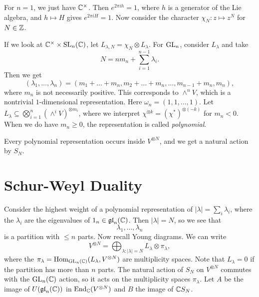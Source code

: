 \begin{example}
  For $n = 1$, we just have
  $\mathbb{C}^\times$. Then $e^{2\pi i h} = 1$,
  where $h$ is a generator of the Lie
  algebra, and $h \mapsto H$
  gives $e^{2\pi i H} = 1$.
  Now consider the character $\chi_N : z \mapsto z^N$ for
  $N \in \mathbb{Z}$.

  If we look at $\mathbb{C}^\times \times \operatorname{SL}_n(\mathbb{C})$,
  let $L_{\lambda, N} = \chi_N \otimes L_\lambda$.
  For $\operatorname{GL}_n$, consider $L_\lambda $ and
  take
  \[
    N = n m_n + \sum_{i = 1}^{n - 1} \lambda_i.
  \]
  Then we get
  \[
    (\lambda_1, \dots, \lambda_n)
    = (m_1 + \dots + m_n, m_2 + \dots + m_n, \dots, m_{n - 1} + m_n, m_n),
  \]
  where $m_n$ is not necessarily positive.
  This corresponds to
  $\wedge^n V$, which is a nontrivial
  $1$-dimensional representation.
  Here $\omega_n = (1, 1, \dots, 1)$.
  Let $L_\lambda \subseteq \bigotimes_{i = 1}^n (\wedge^i V)^{\otimes m_i}$,
  where we interpret
  $\chi^{\otimes k} = (\chi^*)^{\otimes (-k)}$
  for $m_n < 0$.
  When we do have $m_n \ge 0$, the
  representation is called
  \emph{polynomial}.
\end{example}

\begin{remark}
  Every polynomial representation occurs
  inside $V^{\otimes N}$, and
  we get a natural action by $S_N$.
\end{remark}

\section{Schur-Weyl Duality}

\begin{remark}
  Consider the highest weight of
  a polynomial representation of
  $|\lambda| = \sum_i \lambda_i$, where
  the $\lambda_i$ are the eigenvalues
  of $1_n \in \mathfrak{gl}_n(\mathbb{C})$.
  Then $|\lambda| = N$, so we see that
  \[
    \lambda_1, \dots, \lambda_n
  \]
  is a partition with $\le n$ parts.
  Now recall Young diagrams. We can write
  \[
    V^{\otimes N}
    = \bigoplus_{\lambda : |\lambda| = N} L_\lambda \otimes \pi_\lambda,
  \]
  where the $\pi_\lambda = \operatorname{Hom}_{\operatorname{GL}_n(\mathbb{C})}(L_\lambda, V^{\otimes N})$ are multiplicity
  spaces. Note that
  $L_\lambda = 0$ if the partition
  has more than $n$ parts. The natural
  action of $S_N$ on $V^{\otimes N}$
  commutes with the $\operatorname{GL}_n(\mathbb{C})$ action,
  so it acts on the multiplicity spaces
  $\pi_\lambda$. Let
  $A$ be the image of
  $U(\mathfrak{gl}_n(\mathbb{C}))$ in $\operatorname{End}_{\mathbb{C}}(V^{\otimes N})$
  and $B$ the image of
  $\mathbb{C} S_N$.
\end{remark}

